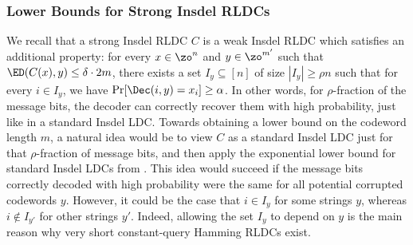 \subsubsection{Lower Bounds for Strong Insdel RLDCs}
We recall that a strong Insdel RLDC $C$ is a weak Insdel RLDC which satisfies an additional property: for every $x \in \zo^n$ and $y \in \zo^{m'}$ such that $\ED(C(x), y) \le \delta\cdot 2m$, 
there exists a set $I_y \subseteq [n]$ of size $|I_y|\ge \rho n$ such that for every $i \in I_y$, we have $\Pr[\Dec(i,y) = x_i] \ge \alpha$. In other words, for $\rho$-fraction of the message bits, the decoder can correctly recover them with high probability, just like in a standard Insdel LDC. 
Towards obtaining a lower bound on the codeword length $m$, a natural idea would be to view $C$ as a standard Insdel LDC just for that $\rho$-fraction of message bits, and then apply the exponential lower bound for standard Insdel LDCs from \cite{blocki2021exponential}. 
This idea would succeed if the message bits correctly decoded with high probability were the same for all potential corrupted codewords $y$. 
However, it could be the case that $i \in I_y$ for some strings $y$, whereas $i \notin I_{y'}$ for other strings $y'$. Indeed, allowing the set $I_y$ to depend on $y$ is the main reason why very short constant-query Hamming RLDCs exist.  

